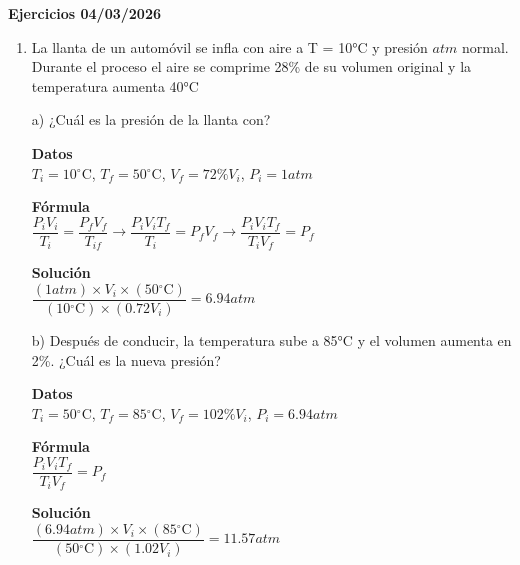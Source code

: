 \documentclass[a4paper, 11pt]{article}
\newcommand{\Pspace}{0.5cm}
\newcommand{\Aspace}{0.2cm}
\begin{document}
    \newpage
    {\Large \textbf{Ejercicios 04/03/2026}}
    \begin{enumerate}
    \vspace{\Pspace}
    \item La llanta de un automóvil se infla con aire a T = 10°C y presión $atm$ normal. Durante el proceso el aire se comprime 28\% de su volumen original y la temperatura aumenta 40°C \par
        \vspace{\Aspace} \par
        a) ¿Cuál es la presión de la llanta con?
        \\ { \color{azul} 
            \textbf{Datos} \\
            $T_{i} = 10\mathrm{^\circ C}$, $T_{f} = 50\mathrm{^\circ C}$, $V_{f} = 72\%V_{i}$, $P_{i} = 1 atm$ \par

            \textbf{Fórmula} \\
            $\dfrac{P_{i} V_{i}}{T_{i}} = \dfrac{P_{f} V_{f}}{T_{if}} \rightarrow \dfrac{P_{i} V_{i} T_{f}}{T_{i}} = P_{f} V_{f} \rightarrow \dfrac{P_{i} V_{i} T_{f}}{T_{i} V_{f}} = P_{f}$ \par

            \textbf{Solución} \\
            $\dfrac{(1 atm) \times V_{i} \times (50\mathrm{^\circ C})}{(10\mathrm{^\circ C}) \times (0.72 V_{i})} = 6.94 atm$
        }

        \vspace{\Aspace} \par
        b) Después de conducir, la temperatura sube a 85°C y el volumen aumenta en 2\%. ¿Cuál es la nueva presión?
        \\ { \color{azul} 
            \textbf{Datos} \\
            $T_{i} = 50\mathrm{^\circ C}$, $T_{f} = 85\mathrm{^\circ C}$, $V_{f} = 102\%V_{i}$, $P_{i} = 6.94 atm$ \par

            \textbf{Fórmula} \\
            $\dfrac{P_{i} V_{i} T_{f}}{T_{i} V_{f}} = P_{f}$ \par

            \textbf{Solución} \\
            $\dfrac{(6.94 atm) \times V_{i} \times (85\mathrm{^\circ C})}{(50\mathrm{^\circ C}) \times (1.02 V_{i})} = 11.57 atm$
        }




\end{enumerate}
\end{document}
